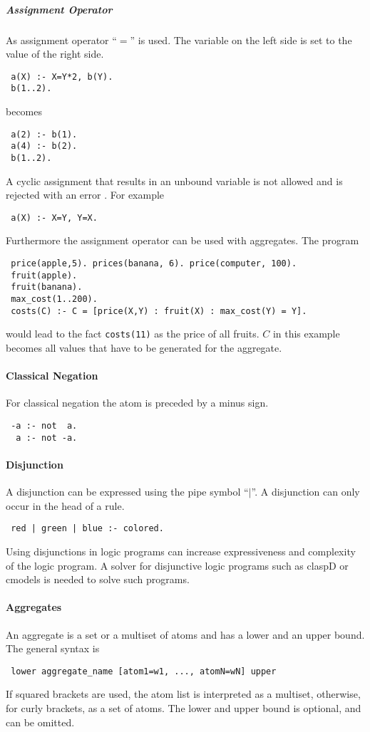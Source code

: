 \documentclass[a4paper,10pt]{article}
\begin{document}
\subparagraph{Assignment Operator}
As assignment operator ``$=$'' is used.
The variable on the left side is set to the value of the right side.
\begin{verbatim}
 a(X) :- X=Y*2, b(Y).
 b(1..2).
\end{verbatim}
becomes
\begin{verbatim}
 a(2) :- b(1).
 a(4) :- b(2).
 b(1..2).
\end{verbatim}
A cyclic assignment that results in an unbound variable is not allowed and is rejected with an error . For example
\begin{verbatim}
 a(X) :- X=Y, Y=X.
\end{verbatim}
Furthermore the assignment operator can be used with aggregates. The program
\begin{verbatim}
 price(apple,5). prices(banana, 6). price(computer, 100).
 fruit(apple).
 fruit(banana).
 max_cost(1..200).
 costs(C) :- C = [price(X,Y) : fruit(X) : max_cost(Y) = Y].
\end{verbatim}
would lead to the fact \texttt{costs(11)} as the price of all fruits.
$C$ in this example becomes all values that have to be generated for the aggregate.

\paragraph{Classical Negation}
For classical negation the atom is preceded by a minus sign.
\begin{verbatim}
 -a :- not  a.
  a :- not -a. 
\end{verbatim}
\paragraph{Disjunction}
A disjunction can be expressed using the pipe symbol ``$\mid$''.
A disjunction can only occur in the head of a rule.
\begin{verbatim}
 red | green | blue :- colored.
\end{verbatim}
Using disjunctions in logic programs can increase expressiveness and complexity of the logic program.
A solver for disjunctive logic programs such as claspD \cite{claspD} or cmodels \cite{cmodels} is needed to solve such programs.

\paragraph{Aggregates}
An aggregate is a set or a multiset of atoms and has a lower and an upper bound.
The general syntax is
\begin{verbatim}
 lower aggregate_name [atom1=w1, ..., atomN=wN] upper
\end{verbatim}
If squared brackets are used, the atom list is interpreted as a multiset, otherwise, for curly brackets, as a set of atoms.
The lower and upper bound is optional, and can be omitted.
\end{document}
